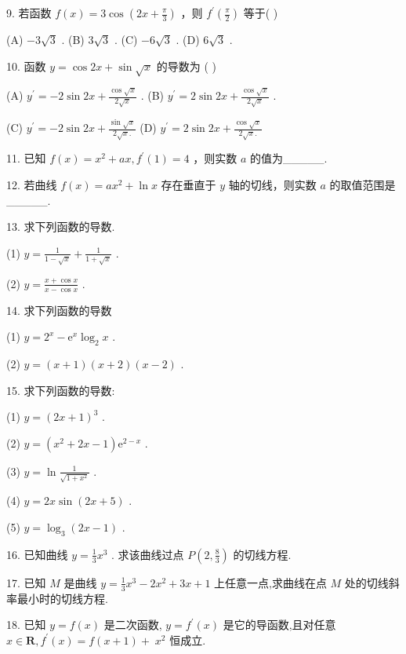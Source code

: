 \documentclass[10pt]{article}
\begin{document}
9. 若函数 \(f\left( x\right)  = 3\cos \left( {{2x} + \frac{\pi }{3}}\right)\) ，则 \({f}^{\prime }\left( \frac{\pi }{2}\right)\) 等于( )

(A) \(- 3\sqrt{3}\) . (B) \(3\sqrt{3}\) . (C) \(- 6\sqrt{3}\) . (D) \(6\sqrt{3}\) .

10. 函数 \(y = \cos {2x} + \sin \sqrt{x}\) 的导数为 ( )

(A) \({y}^{\prime } =  - 2\sin {2x} + \frac{\cos \sqrt{x}}{2\sqrt{x}}\) . (B) \({y}^{\prime } = 2\sin {2x} + \frac{\cos \sqrt{x}}{2\sqrt{x}}\) .

(C) \({y}^{\prime } =  - 2\sin {2x} + \frac{\sin \sqrt{x}}{2\sqrt{x}.}\) (D) \({y}^{\prime } = 2\sin {2x} + \frac{\cos \sqrt{x}}{2\sqrt{x}.}\)

11. 已知 \(f\left( x\right)  = {x}^{2} + {ax},{f}^{\prime }\left( 1\right)  = 4\) ，则实数 \(a\) 的值为\_\_\_\_\_.

12. 若曲线 \(f\left( x\right)  = a{x}^{2} + \ln x\) 存在垂直于 \(y\) 轴的切线，则实数 \(a\) 的取值范围是\_\_\_\_\_.

13. 求下列函数的导数.

(1) \(y = \frac{1}{1 - \sqrt{x}} + \frac{1}{1 + \sqrt{x}}\) .

(2) \(y = \frac{x + \cos x}{x - \cos x}\) .

14. 求下列函数的导数

(1) \(y = {2}^{x} - {\mathrm{e}}^{x}{\log }_{2}x\) .

(2) \(y = \left( {x + 1}\right) \left( {x + 2}\right) \left( {x - 2}\right)\) .

15. 求下列函数的导数:

(1) \(y = {\left( 2x + 1\right) }^{3}\) .

(2) \(y = \left( {{x}^{2} + {2x} - 1}\right) {\mathrm{e}}^{2 - x}\) .

(3) \(y = \ln \frac{1}{\sqrt{1 + {x}^{2}}}\) .

(4) \(y = {2x}\sin \left( {{2x} + 5}\right)\) .

(5) \(y = {\log }_{3}\left( {{2x} - 1}\right)\) .

16. 已知曲线 \(y = \frac{1}{3}{x}^{3}\) . 求该曲线过点 \(P\left( {2,\frac{8}{3}}\right)\) 的切线方程.

17. 已知 \(M\) 是曲线 \(y = \frac{1}{3}{x}^{3} - 2{x}^{2} + {3x} + 1\) 上任意一点,求曲线在点 \(M\) 处的切线斜率最小时的切线方程.

18. 已知 \(y = f\left( x\right)\) 是二次函数, \(y = {f}^{\prime }\left( x\right)\) 是它的导函数,且对任意 \(x \in  \mathbf{R},{f}^{\prime }\left( x\right)  = f\left( {x + 1}\right)  + \; {x}^{2}\) 恒成立.
\end{document}
